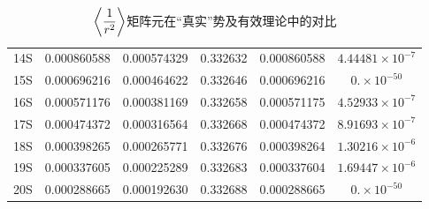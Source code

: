 \documentclass[cs4size,titlepage,twoside]{ctexart}
\begin{document}
\begin{table}[!tp]
\begin{tabular}{|cccccc|}
		14S                   & 0.000860588                                  & 0.000574329                                        & 0.332632                                           & 0.000860588                                                                           & $4.44481\times10^{-7}$   \\
		15S                   & 0.000696216                                  & 0.000464622                                        & 0.332646                                           & 0.000696216                                                                           & $0.\times10^{-50}$       \\
		16S                   & 0.000571176                                  & 0.000381169                                        & 0.332658                                           & 0.000571175                                                                           & $4.52933\times10^{-7}$   \\
		17S                   & 0.000474372                                  & 0.000316564                                        & 0.332668                                           & 0.000474372                                                                           & $8.91693\times10^{-7}$   \\
		18S                   & 0.000398265                                  & 0.000265771                                        & 0.332676                                           & 0.000398264                                                                           & $1.30216\times10^{-6}$   \\
		19S                   & 0.000337605                                  & 0.000225289                                        & 0.332683                                           & 0.000337604                                                                           & $1.69447\times10^{-6}$   \\
		20S                   & 0.000288665                                  & 0.000192630                                        & 0.332688                                           & 0.000288665                                                                           & $0.\times10^{-50}$       \\
		\hline
	\end{tabular}
	\caption{$\displaystyle\expval{\frac{1}{r^2}}$矩阵元在“真实”势及有效理论中的对比}\label{evr2}
\end{table}
\end{document}
